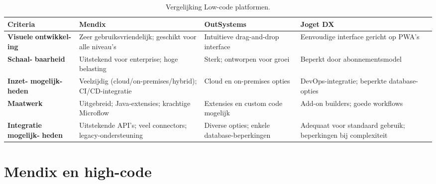 \begin{table}
    \centering
    \begin{tabular}{ |p{2cm}|p{4cm}|p{4cm}|p{4cm}|   }
        \hline
        \textbf{Criteria} & \textbf{Mendix} & \textbf{OutSystems} & \textbf{Joget DX} \\
        \hline
        \textbf{Visuele} \newline \textbf{ontwikkel-ing} & Zeer gebruiksvriendelijk; geschikt voor alle niveau's & Intuïtieve drag-and-drop interface & Eenvoudige interface gericht op \gls{PWA}'s \\
        \textbf{Schaal-} \newline \textbf{baarheid} & Uitstekend voor enterprise; hoge belasting   & Sterk; ontworpen voor groei & Beperkt door abonnementsmodel \\
        \textbf{Inzet-} \newline \textbf{mogelijk-} \newline \textbf{heden} & Veelzijdig (cloud/on-premises/hybrid); CI/CD-integratie & Cloud en on-premises opties & DevOps-integratie; beperkte database-opties \\
        \textbf{Maatwerk} & Uitgebreid; Java-extensies; krachtige Microflow & Extensies en custom code mogelijk & Add-on builders; goede workflows \\
        \textbf{Integratie} \newline \textbf{mogelijk-} \newline \textbf{heden} & Uitstekende \gls{API}'s; veel connectors; legacy-ondersteuning & Diverse opties; enkele database-beperkingen & Adequaat voor standaard gebruik; beperkingen bij complexiteit \\
        \hline
    \end{tabular}
    \caption[Low-Code Platforms Comparison]{\label{tab:Vergelijking Low-code platformen}Vergelijking Low-code platformen.}
\end{table}

\section{Mendix en high-code}
